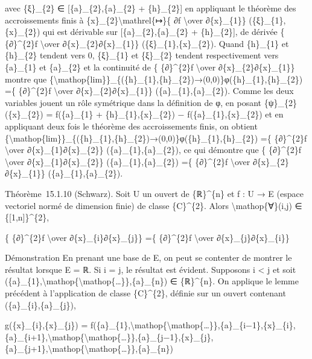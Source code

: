 \documentclass[]{article}
\begin{document}
avec \{ξ\}\_\{2\} ∈ {[}\{a\}\_\{2\},\{a\}\_\{2\} + \{h\}\_\{2\}{]} en
appliquant le théorème des accroissements finis à
\{x\}\_\{2\}\textbackslash{}mathrel\{↦\}\{ ∂f \textbackslash{}over
∂\{x\}\_\{1\}\} (\{ξ\}\_\{1\},\{x\}\_\{2\}) qui est dérivable sur
{[}\{a\}\_\{2\},\{a\}\_\{2\} + \{h\}\_\{2\}{]}, de dérivée \{
\{∂\}\^{}\{2\}f \textbackslash{}over ∂\{x\}\_\{2\}∂\{x\}\_\{1\}\}
(\{ξ\}\_\{1\},\{x\}\_\{2\}). Quand \{h\}\_\{1\} et \{h\}\_\{2\} tendent
vers 0, \{ξ\}\_\{1\} et \{ξ\}\_\{2\} tendent respectivement vers
\{a\}\_\{1\} et \{a\}\_\{2\} et la continuité de \{ \{∂\}\^{}\{2\}f
\textbackslash{}over ∂\{x\}\_\{2\}∂\{x\}\_\{1\}\} montre que
\{\textbackslash{}mathop\{lim\}\}\_\{(\{h\}\_\{1\},\{h\}\_\{2\})→(0,0)\}φ(\{h\}\_\{1\},\{h\}\_\{2\})
=\{ \{∂\}\^{}\{2\}f \textbackslash{}over ∂\{x\}\_\{2\}∂\{x\}\_\{1\}\}
(\{a\}\_\{1\},\{a\}\_\{2\}). Comme les deux variables jouent un rôle
symétrique dans la définition de φ, en posant \{ψ\}\_\{2\}(\{x\}\_\{2\})
= f(\{a\}\_\{1\} + \{h\}\_\{1\},\{x\}\_\{2\}) −
f(\{a\}\_\{1\},\{x\}\_\{2\}) et en appliquant deux fois le théorème des
accroissements finis, on obtient
\{\textbackslash{}mathop\{lim\}\}\_\{(\{h\}\_\{1\},\{h\}\_\{2\})→(0,0)\}φ(\{h\}\_\{1\},\{h\}\_\{2\})
=\{ \{∂\}\^{}\{2\}f \textbackslash{}over ∂\{x\}\_\{1\}∂\{x\}\_\{2\}\}
(\{a\}\_\{1\},\{a\}\_\{2\}), ce qui démontre que \{ \{∂\}\^{}\{2\}f
\textbackslash{}over ∂\{x\}\_\{1\}∂\{x\}\_\{2\}\}
(\{a\}\_\{1\},\{a\}\_\{2\}) =\{ \{∂\}\^{}\{2\}f \textbackslash{}over
∂\{x\}\_\{2\}∂\{x\}\_\{1\}\} (\{a\}\_\{1\},\{a\}\_\{2\}).

Théorème~15.1.10 (Schwarz). Soit U un ouvert de \{ℝ\}\^{}\{n\} et f : U
→ E (espace vectoriel normé de dimension finie) de classe
\{C\}\^{}\{2\}. Alors \textbackslash{}mathop\{∀\}(i,j) ∈
\{{[}1,n{]}\}\^{}\{2\},

\{ \{∂\}\^{}\{2\}f \textbackslash{}over ∂\{x\}\_\{i\}∂\{x\}\_\{j\}\} =\{
\{∂\}\^{}\{2\}f \textbackslash{}over ∂\{x\}\_\{j\}∂\{x\}\_\{i\}\}

Démonstration En prenant une base de E, on peut se contenter de montrer
le résultat lorsque E = ℝ. Si i = j, le résultat est évident. Supposons
i \textless{} j et soit
(\{a\}\_\{1\},\textbackslash{}mathop\{\textbackslash{}mathop\{\ldots{}\}\},\{a\}\_\{n\})
∈ \{ℝ\}\^{}\{n\}. On applique le lemme précédent à l'application de
classe \{C\}\^{}\{2\}, définie sur un ouvert contenant
(\{a\}\_\{i\},\{a\}\_\{j\}),

g(\{x\}\_\{i\},\{x\}\_\{j\}) =
f(\{a\}\_\{1\},\textbackslash{}mathop\{\textbackslash{}mathop\{\ldots{}\}\},\{a\}\_\{i−1\},\{x\}\_\{i\},\{a\}\_\{i+1\},\textbackslash{}mathop\{\textbackslash{}mathop\{\ldots{}\}\},\{a\}\_\{j−1\},\{x\}\_\{j\},\{a\}\_\{j+1\},\textbackslash{}mathop\{\textbackslash{}mathop\{\ldots{}\}\},\{a\}\_\{n\})
\end{document}
